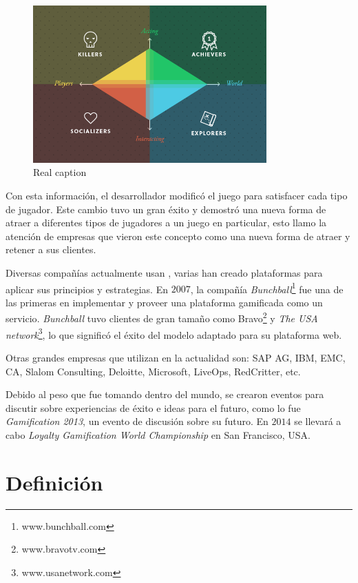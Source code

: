 \begin{figure}[!htb]
  \centering
  \includegraphics[width=0.8\textwidth]{images/TypeOfPlayersBartle.png}
  \caption[Caption for LOF]{Real caption\footnotemark}
  \label{fig:Players}
\end{figure}


Con esta información, el desarrollador modificó el juego para satisfacer cada
tipo de jugador.
Este cambio tuvo un gran éxito y demostró una nueva forma de atraer a diferentes
tipos de jugadores a un juego en particular, esto llamo la atención de empresas
que vieron este concepto como una nueva forma de atraer y retener a sus clientes.

Diversas compañías actualmente usan {\GAM}, varias han creado plataformas para
aplicar sus principios y estrategias.
En $2007$, la compañía \emph{Bunchball}\footnote{www.bunchball.com} fue una de
las primeras en implementar y proveer una plataforma gamificada como un
servicio\cite{Gam:Bunchball:1}.
\emph{Bunchball} tuvo clientes de gran tamaño como Bravo\footnote{www.bravotv.com}
y \emph{The USA network}\footnote{www.usanetwork.com}\cite{Gam:Bunchball:2},
lo que significó el éxito del modelo adaptado para su plataforma web.

Otras grandes empresas que utilizan {\GAM} en la actualidad son:
SAP AG, IBM, EMC, CA, Slalom Consulting, Deloitte, Microsoft, LiveOps,
RedCritter\cite{Gam:Companies:1}, etc.

Debido al peso que {\GAM} fue tomando dentro del mundo,
se crearon eventos para discutir sobre experiencias de éxito e ideas para
el futuro, como lo fue \emph{Gamification 2013},
un evento de discusión sobre su futuro\cite{Gam:Events:1}.
En $2014$ se llevará a cabo \emph{Loyalty Gamification World Championship}
en San Francisco, USA\cite{Gam:Events:2}.

\section{Definición}

